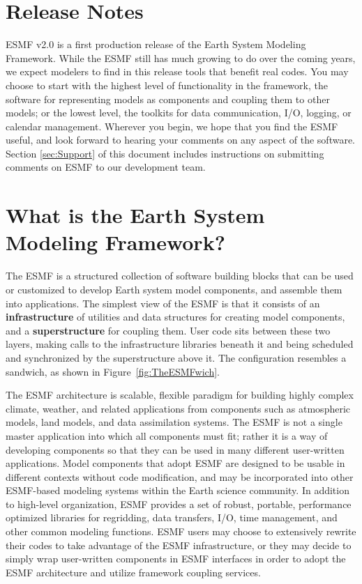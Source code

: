 
\section{Release Notes}

ESMF v2.0 is a first production release of the Earth System 
Modeling Framework.  While the ESMF still has much growing to do
over the coming years, we expect modelers to find in this release 
tools that benefit real codes.  You may choose to start with the
highest level of functionality in the framework, the software
for representing models as components and coupling them to other
models; or the lowest level, the toolkits for data communication,
I/O, logging, or calendar management.  Wherever you begin, we hope
that you find the ESMF useful, and look forward to hearing your
comments on any aspect of the software.
Section \ref{sec:Support} 
of this document includes instructions on submitting comments on 
ESMF to our development team.

\section{What is the Earth System Modeling Framework?}

The ESMF is a structured collection of software building blocks that 
can be used or customized to develop 
Earth system model components, and assemble them into applications.  
The simplest view of the ESMF is that it consists of an
{\bf infrastructure} of utilities and data structures for creating 
model components, and a {\bf superstructure} for coupling them.  
User code sits between these two layers, making calls to the infrastructure
libraries beneath it and being scheduled and synchronized by the 
superstructure above it.  The configuration resembles a sandwich, as
shown in Figure~\ref{fig:TheESMFwich}.

The ESMF architecture is scalable, flexible paradigm for building highly 
complex climate, weather, and related applications from components such
as atmospheric models, land models, and data assimilation systems.  The 
ESMF is not a single master application into which all components must fit; 
rather it is a way of developing components so that they can be used 
in many different user-written applications.  Model components that adopt 
ESMF are designed to be usable in different contexts without code 
modification, and may be
incorporated into other ESMF-based modeling systems within the Earth 
science community.  In addition to high-level organization, ESMF provides 
a set of robust, portable, performance optimized libraries for regridding, 
data transfers, I/O, time management, and other common modeling functions.  
ESMF users may choose to extensively rewrite their codes to take advantage 
of the ESMF infrastructure, or they may decide to simply wrap user-written 
components in ESMF interfaces in order to adopt the ESMF architecture and 
utilize framework coupling services.

